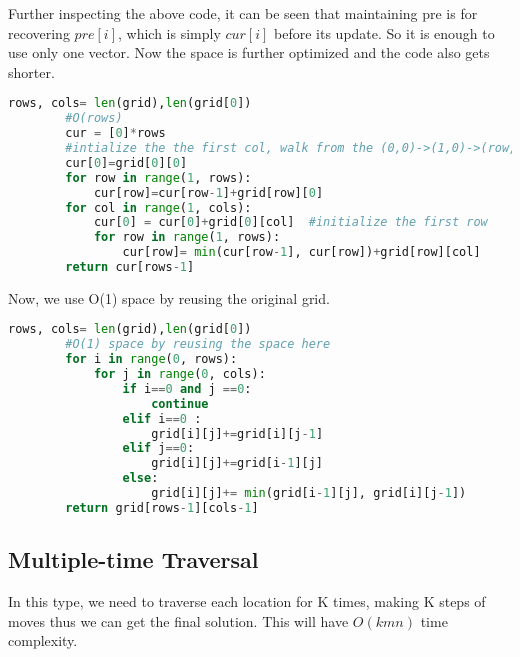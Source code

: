 \documentclass[../main.tex]{subfiles}
\begin{document}
Further inspecting the above code, it can be seen that maintaining pre is for recovering $pre[i]$, which is simply $cur[i]$ before its update. So it is enough to use only one vector. Now the space is further optimized and the code also gets shorter.
\begin{lstlisting}[language = Python]
rows, cols= len(grid),len(grid[0])
        #O(rows) 
        cur = [0]*rows
        #intialize the the first col, walk from the (0,0)->(1,0)->(row,0)
        cur[0]=grid[0][0]
        for row in range(1, rows):
            cur[row]=cur[row-1]+grid[row][0]
        for col in range(1, cols):
            cur[0] = cur[0]+grid[0][col]  #initialize the first row
            for row in range(1, rows):
                cur[row]= min(cur[row-1], cur[row])+grid[row][col]
        return cur[rows-1]
\end{lstlisting}

Now, we use O(1) space by reusing the original grid.
\begin{lstlisting}[language = Python]
rows, cols= len(grid),len(grid[0])
        #O(1) space by reusing the space here
        for i in range(0, rows):
            for j in range(0, cols):
                if i==0 and j ==0:
                    continue
                elif i==0 :
                    grid[i][j]+=grid[i][j-1]
                elif j==0:
                    grid[i][j]+=grid[i-1][j]
                else:
                    grid[i][j]+= min(grid[i-1][j], grid[i][j-1])
        return grid[rows-1][cols-1]
\end{lstlisting}
\subsection{Multiple-time Traversal}
In this type, we need to traverse each location for K times, making K steps of moves thus we can get the final solution. This will have $O(kmn)$ time complexity. 
\end{document}
